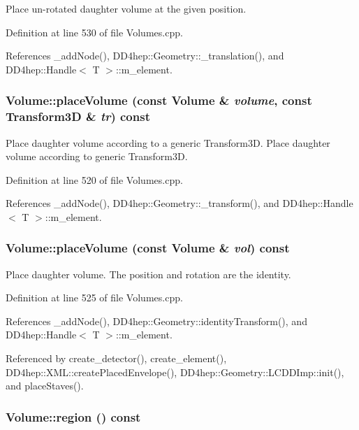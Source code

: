 Place un-\/rotated daughter volume at the given position. 

Definition at line 530 of file Volumes.cpp.

References \_\-addNode(), DD4hep::Geometry::\_\-translation(), and DD4hep::Handle$<$ T $>$::m\_\-element.\hypertarget{class_d_d4hep_1_1_geometry_1_1_volume_a6dc8c06bdc867360d95e4db2ce71a471}{
\subsubsection[{placeVolume}]{ Volume::placeVolume (const {\bf Volume} \& {\em volume}, \/  const {\bf Transform3D} \& {\em tr}) const}}
\label{class_d_d4hep_1_1_geometry_1_1_volume_a6dc8c06bdc867360d95e4db2ce71a471}


Place daughter volume according to a generic Transform3D. Place daughter volume according to generic Transform3D. 

Definition at line 520 of file Volumes.cpp.

References \_\-addNode(), DD4hep::Geometry::\_\-transform(), and DD4hep::Handle$<$ T $>$::m\_\-element.\hypertarget{class_d_d4hep_1_1_geometry_1_1_volume_a61a47d1aa7dfeb411f663d7425aad1e6}{
\subsubsection[{placeVolume}]{ Volume::placeVolume (const {\bf Volume} \& {\em vol}) const}}
\label{class_d_d4hep_1_1_geometry_1_1_volume_a61a47d1aa7dfeb411f663d7425aad1e6}


Place daughter volume. The position and rotation are the identity. 

Definition at line 525 of file Volumes.cpp.

References \_\-addNode(), DD4hep::Geometry::identityTransform(), and DD4hep::Handle$<$ T $>$::m\_\-element.

Referenced by create\_\-detector(), create\_\-element(), DD4hep::XML::createPlacedEnvelope(), DD4hep::Geometry::LCDDImp::init(), and placeStaves().\hypertarget{class_d_d4hep_1_1_geometry_1_1_volume_a849db64ccfd2670fd485593f67ae2bb3}{
\subsubsection[{region}]{ Volume::region () const}}
\label{class_d_d4hep_1_1_geometry_1_1_volume_a849db64ccfd2670fd485593f67ae2bb3}


